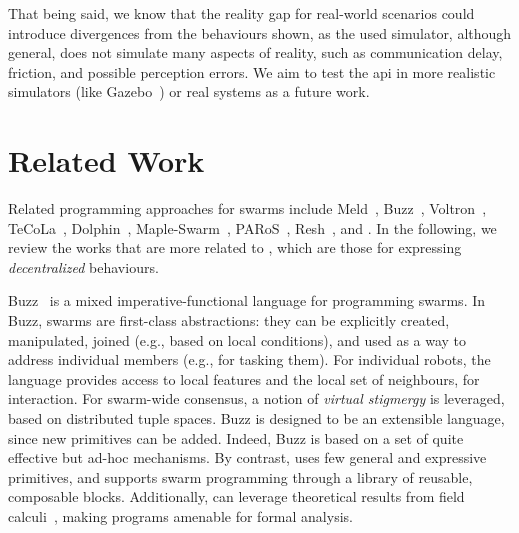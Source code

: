 That being said, we know that the reality gap for real-world scenarios could introduce divergences from the behaviours shown, as the used simulator, although general, does not simulate many aspects of reality, such as communication delay, friction, and possible perception errors. 
%
We aim to test the \ac{api} in more realistic simulators (like Gazebo~\cite{DBLP:conf/iros/KoenigH04}) or real systems as a future work.

\section{Related Work}
\label{sec:rw}

Related programming approaches for swarms 
 include 
 Meld~\cite{Meld2007},
 Buzz~\cite{DBLP:conf/iros/PinciroliB16},
 Voltron~\cite{Mottola2014voltron},
 TeCoLa~\cite{Koutsoubelias2016tecola},
 Dolphin~\cite{lima2018dolphin},
 Maple-Swarm~\cite{DBLP:conf/isola/KosakHBWHR20}, 
 PARoS~\cite{paros},
 Resh~\cite{DBLP:conf/icra/CarrollNS21}, 
 and \cite{DBLP:conf/iros/YiDLD0WY20}.
%
%
In the following, we review the works that are more related to \MacroSwarm{},
 which are those for expressing \emph{decentralized} behaviours.
 

Buzz~\cite{DBLP:conf/iros/PinciroliB16}
 is a mixed imperative-functional language for programming swarms.
%
%
In Buzz, swarms are first-class abstractions:
 they can be explicitly created,
 manipulated,
 joined (e.g., based on local conditions),
 and used as a way to address individual members (e.g., for tasking them). %
%
For individual robots, 
 the language provides access to local features
 and the local set of neighbours, for interaction.
%
For swarm-wide consensus, 
 a notion of \emph{virtual stigmergy} is leveraged,
 based on distributed tuple spaces.
%
Buzz is designed to be an extensible language, since new primitives can be added.
%
Indeed, Buzz is based on a set of quite effective but ad-hoc mechanisms.
%
By contrast, \MacroSwarm{} uses few general and expressive primitives, 
  and supports swarm programming
  through a library of reusable, composable blocks.
%
%
Additionally, \MacroSwarm{} can leverage theoretical results from field calculi~\cite{DBLP:journals/jlap/ViroliBDACP19,DBLP:journals/tomacs/ViroliABDP18}, making programs amenable for formal analysis.


